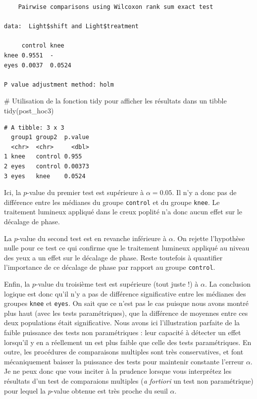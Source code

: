 \documentclass[
  a4paper,
]{article}
\newenvironment{Shaded}{\begin{snugshade}}{\end{snugshade}}
\newcommand{\CommentTok}[1]{\textcolor[rgb]{0.54,0.53,0.53}{#1}}
\newcommand{\FunctionTok}[1]{\textcolor[rgb]{0.39,0.29,0.61}{#1}}
\newcommand{\NormalTok}[1]{\textcolor[rgb]{0.12,0.11,0.11}{#1}}
\begin{document}
\begin{verbatim}
    Pairwise comparisons using Wilcoxon rank sum exact test 

data:  Light$shift and Light$treatment 

     control knee  
knee 0.9551  -     
eyes 0.0037  0.0524

P value adjustment method: holm 
\end{verbatim}

\begin{Shaded}
\begin{Highlighting}[]
\CommentTok{\# Utilisation de la fonction \textasciigrave{}tidy\textasciigrave{} pour afficher les résultats dans un tibble}
\FunctionTok{tidy}\NormalTok{(post\_hoc3)}
\end{Highlighting}
\end{Shaded}

\begin{verbatim}
# A tibble: 3 x 3
  group1 group2  p.value
  <chr>  <chr>     <dbl>
1 knee   control 0.955  
2 eyes   control 0.00373
3 eyes   knee    0.0524 
\end{verbatim}

Ici, la \(p\)-value du premier test est supérieure à \(\alpha = 0.05\). Il n'y a donc pas de différence entre les médianes du groupe \texttt{control} et du groupe \texttt{knee}. Le traitement lumineux appliqué dans le creux poplité n'a donc aucun effet sur le décalage de phase.

La \(p\)-value du second test est en revanche inférieure à \(\alpha\). On rejette l'hypothèse nulle pour ce test ce qui confirme que le traitement lumineux appliqué au niveau des yeux a un effet sur le décalage de phase. Reste toutefois à quantifier l'importance de ce décalage de phase par rapport au groupe \texttt{control}.

Enfin, la \(p\)-value du troisième test est supérieure (tout juste !) à \(\alpha\). La conclusion logique est donc qu'il n'y a pas de différence significative entre les médianes des groupes \texttt{knee} et \texttt{eyes}. On sait que ce n'est pas le cas puisque nous avons montré plus haut (avec les tests paramétriques), que la différence de moyennes entre ces deux populations était significative. Nous avons ici l'illustration parfaite de la faible puissance des tests non paramétriques : leur capacité à détecter un effet lorsqu'il y en a réellement un est plus faible que celle des tests paramétriques. En outre, les procédures de comparaisons multiples sont très conservatives, et font mécaniquement baisser la puissance des tests pour maintenir constante l'erreur \(\alpha\). Je ne peux donc que vous inciter à la prudence lorsque vous interprétez les résultats d'un test de comparaions multiples (\emph{a fortiori} un test non paramétrique) pour lequel la \(p\)-value obtenue est très proche du seuil \(\alpha\).
\end{document}
